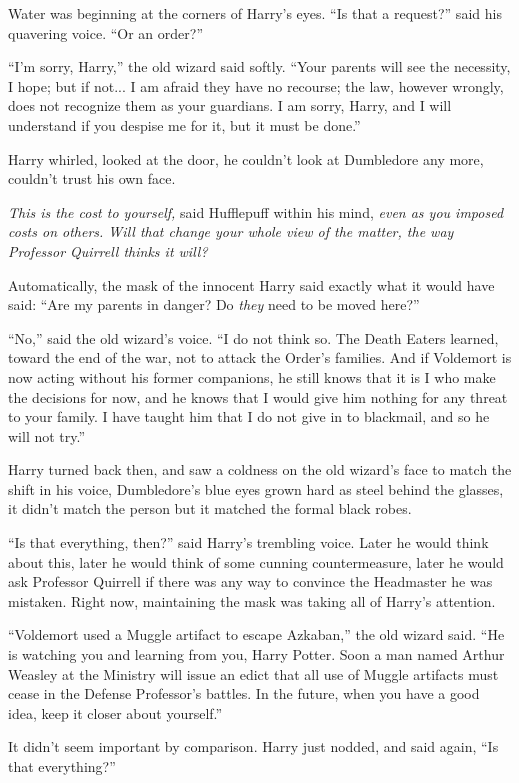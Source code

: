 Water was beginning at the corners of Harry's eyes. ``Is that a request?'' said his quavering voice. ``Or an order?''

``I'm sorry, Harry,'' the old wizard said softly. ``Your parents will see the necessity, I hope; but if not... I am afraid they have no recourse; the law, however wrongly, does not recognize them as your guardians. I am sorry, Harry, and I will understand if you despise me for it, but it must be done.''

Harry whirled, looked at the door, he couldn't look at Dumbledore any more, couldn't trust his own face.

\emph{This is the cost to yourself,} said Hufflepuff within his mind, \emph{even as you imposed costs on others. Will that change your whole view of the matter, the way Professor Quirrell thinks it will?}

Automatically, the mask of the innocent Harry said exactly what it would have said: ``Are my parents in danger? Do \emph{they} need to be moved here?''

``No,'' said the old wizard's voice. ``I do not think so. The Death Eaters learned, toward the end of the war, not to attack the Order's families. And if Voldemort is now acting without his former companions, he still knows that it is I who make the decisions for now, and he knows that I would give him nothing for any threat to your family. I have taught him that I do not give in to blackmail, and so he will not try.''

Harry turned back then, and saw a coldness on the old wizard's face to match the shift in his voice, Dumbledore's blue eyes grown hard as steel behind the glasses, it didn't match the person but it matched the formal black robes.

``Is that everything, then?'' said Harry's trembling voice. Later he would think about this, later he would think of some cunning countermeasure, later he would ask Professor Quirrell if there was any way to convince the Headmaster he was mistaken. Right now, maintaining the mask was taking all of Harry's attention.

``Voldemort used a Muggle artifact to escape Azkaban,'' the old wizard said. ``He is watching you and learning from you, Harry Potter. Soon a man named Arthur Weasley at the Ministry will issue an edict that all use of Muggle artifacts must cease in the Defense Professor's battles. In the future, when you have a good idea, keep it closer about yourself.''

It didn't seem important by comparison. Harry just nodded, and said again, ``Is that everything?''

